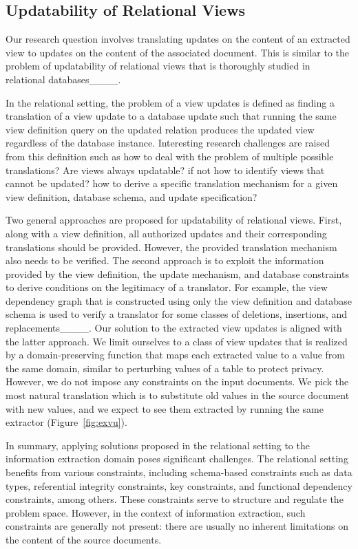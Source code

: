 \subsection{Updatability of Relational Views}
Our research question involves translating updates on  the content of an extracted view to updates on the content of the associated  document. This is similar to the problem of updatability of relational views that is thoroughly studied in relational databases____. 

In the relational setting, the problem of a view updates is defined as finding a translation of a view update   to a database update  such that running the same view definition query on the updated relation produces the updated view regardless of the database instance. Interesting research  challenges are raised from this definition such as how to deal with the problem of multiple possible translations? Are views always updatable? if not how to identify views that cannot be updated? how to derive a specific translation mechanism for a given view definition, database schema, and update specification? 


Two general approaches are proposed for updatability of relational views.  First, along with a view definition, all authorized updates and their corresponding translations should be provided. However, the provided translation mechanism also needs to be verified. The second approach is to exploit the information provided by the view definition, the update mechanism, and database constraints to derive conditions on the legitimacy of a translator. For example, the view dependency graph that is constructed using only the view definition and database schema is used to verify a translator for some classes of deletions, insertions, and replacements____. Our solution to the extracted view updates is aligned with the latter approach.  We limit ourselves to a class of view updates that is realized by a domain-preserving function that maps each extracted value to a value from the same domain, similar to perturbing values of a table to protect privacy.  However,  we do not impose any constraints on the input documents. 
We pick the most natural translation which is to substitute old values in the source document with new values, and we expect to see them extracted by running the same extractor (Figure~\ref{fig:exvu}).\par
In summary, applying solutions proposed in the relational setting to the information extraction domain poses significant challenges. The relational setting benefits from various constraints, including schema-based constraints such as data types, referential integrity constraints, key constraints, and functional dependency constraints, among others. These constraints serve to structure and regulate the problem space. However, in the context of information extraction, such constraints are generally not present: there are usually no inherent limitations on the content of the source documents.

